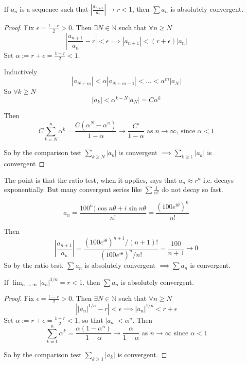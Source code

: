 \documentclass[10pt,twoside]{scrartcl}
\begin{document}
\begin{theorem}
If $a_n$ is a sequence such that $\left|\frac{a_{n+1}}{a_n}\right| \to r < 1$, then $\sum a_n$ is absolutely convergent.	
\end{theorem}
\begin{proof}
Fix $\epsilon = \frac{1-r}{2} > 0$. Then $\exists N \in \mathbb{N}$ such that $\forall n \geq N$
\[\left|\frac{a_{n+1}}{a_n} - r\right| < \epsilon \implies |a_{n+1}| < (r + \epsilon)|a_n|\]
Set $\alpha := r + \epsilon = \frac{1 + r}{2} < 1$. 

Inductively
\[|a_{N+m}| < \alpha|a_{N+m-1}| < \dots < \alpha^m|a_N|\]	
So $\forall k \geq N$ \[|a_k| <  \alpha^{k-N}|a_N| = C\alpha^k\]

Then \[C\sum_{k=N}^{n} \alpha^k = \frac{C(\alpha^N-\alpha^n)}{1-\alpha} \to \frac{C'}{1-\alpha} \text{ as } n \to \infty \text{, since } \alpha < 1\]

So by the comparison test $\sum_{k\geq N} |a_k|$ is convergent $\implies \sum_{k\geq 1} |a_k|$ is convergent
\end{proof}

The point is that the ratio test, when it applies, says that $a_n \approx r^n$ i.e. decays exponentially. But many convergent series like $\sum \frac{1}{n^2}$ do not decay so fast.\\

\begin{example}
\[a_n = \dfrac{100^n(\cos n\theta + i\sin n\theta}{n!} = \dfrac{(100e^{i\theta})^n}{n!}\]

Then 
\[\left|\frac{a_{n+1}}{a_n}\right| = \frac{(100e^{i\theta})^{n+1}/(n+1)!}{(100e^{i\theta})^{n}/n!} = \frac{100}{n+1} \to 0\]
So by the ratio test, $\sum a_n$ is absolutely convergent $\implies \sum a_n$ is convergent.	
\end{example}
 
\begin{theorem}
If  $\lim_{n\to \infty} |a_n|^{1/n} = r < 1$, then $\sum a_n$ is absolutely convergent.	
\end{theorem}
\begin{proof}
Fix $\epsilon = \frac{1-r}{2} > 0$. Then $\exists N \in \mathbb{N}$ such that $\forall n \geq N$
\[\left||a_n|^{1/n} - r\right| < \epsilon \implies |a_n|^{1/n} < r + \epsilon\]
Set $\alpha := r + \epsilon = \frac{1 + r}{2} < 1$, so that $|a_n| < \alpha^n$. Then
\[ \sum_{k=1}^n\alpha^k = \frac{\alpha(1-\alpha^n)}{1-\alpha}  \to \frac{\alpha}{1-\alpha} \text{ as } n \to \infty \text{ since } \alpha < 1\]

So by the comparison test $\sum_{k\geq 1} |a_k|$ is convergent.
\end{proof}
\end{document}
